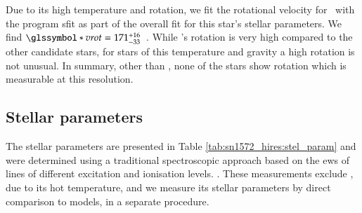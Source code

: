 Due to its high temperature and rotation, we fit the rotational velocity for \starb\ with the program \gls{sfit} \citep[][described in section \ref{sec:stellar-parameters}]{2001A&A...376..497J}  as part of the overall fit for this star's stellar parameters.  We find $\vrot=171^{+16}_{-33}$~\kms. While \starb's rotation is very high compared to the other candidate stars,  for stars of this temperature and gravity a high rotation is not unusual. In summary, other than \starb, none of the stars show rotation which is measurable at this resolution.


\subsection{Stellar parameters}
\label{sec:stellar-parameters}
The stellar parameters are presented in Table \ref{tab:sn1572_hires:stel_param} and were determined using a traditional spectroscopic approach based on the \glspl{ew} of lines of different excitation and ionisation levels. . These measurements exclude \starb, due to its hot temperature, and we measure its stellar parameters by direct comparison to models, in a separate procedure.
\ctable[
width=\textwidth,
caption = {Measured \glsentryplural{ew} from the Keck \glsentryname{hires} spectra},
label = {tab:sn1572_hires:llist},
pos=t
]

